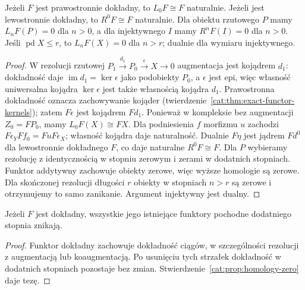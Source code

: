 \begin{stwierdzenie}\label{cat:prop:derived-degree-zero}
Jeżeli $F$ jest prawostronnie dokładny, to $L_0F\cong F$ naturalnie. Jeżeli jest lewostronnie dokładny, to $R^0F\cong F$ naturalnie. Dla obiektu rzutowego $P$ mamy $L_nF(P)=0$ dla $n>0$, a dla injektywnego $I$ mamy $R^nF(I)=0$ dla $n>0$. Jeśli $\operatorname{pd}X\le r$, to $L_nF(X)=0$ dla $n>r$; dualnie dla wymiaru injektywnego.
\end{stwierdzenie}
\begin{proof}
W rezolucji rzutowej $P_1\xrightarrow{d_1}P_0\xrightarrow{\epsilon}X\to0$ augmentacja jest kojądrem $d_1$: dokładność daje $\operatorname{im}d_1=\ker\epsilon$ jako podobiekty $P_0$, a $\epsilon$ jest epi, więc własność uniwersalna kojądra $\ker\epsilon$ jest także własnością kojądra $d_1$. Prawostronna dokładność oznacza zachowywanie kojąder (twierdzenie~\ref{cat:thm:exact-functor-kernels}); zatem $F\epsilon$ jest kojądrem $Fd_1$. Ponieważ w kompleksie bez augmentacji $Z_0=FP_0$, mamy $L_0F(X)\cong FX$. Dla podniesienia $f$ morfizmu $u$ zachodzi $F\epsilon_Y Ff_0=Fu F\epsilon_X$; własność kojądra daje naturalność. Dualnie $F\eta$ jest jądrem $Fd^0$ dla lewostronnie dokładnego $F$, co daje naturalne $R^0F\cong F$.
Dla $P$ wybieramy rezolucję z identycznością w stopniu zerowym i zerami w dodatnich stopniach. Funktor addytywny zachowuje obiekty zerowe, więc wyższe homologie są zerowe. Dla skończonej rezolucji długości $r$ obiekty w stopniach $n>r$ są zerowe i otrzymujemy to samo zanikanie. Argument injektywny jest dualny.
\end{proof}
\begin{stwierdzenie}\label{cat:prop:exact-derived-zero}
Jeżeli $F$ jest dokładny, wszystkie jego istniejące funktory pochodne dodatniego stopnia znikają.
\end{stwierdzenie}
\begin{proof}
Funktor dokładny zachowuje dokładność ciągów, w szczególności rezolucji z augmentacją lub koaugmentacją. Po usunięciu tych strzałek dokładność w dodatnich stopniach pozostaje bez zmian. Stwierdzenie~\ref{cat:prop:homology-zero} daje tezę.
\end{proof}

